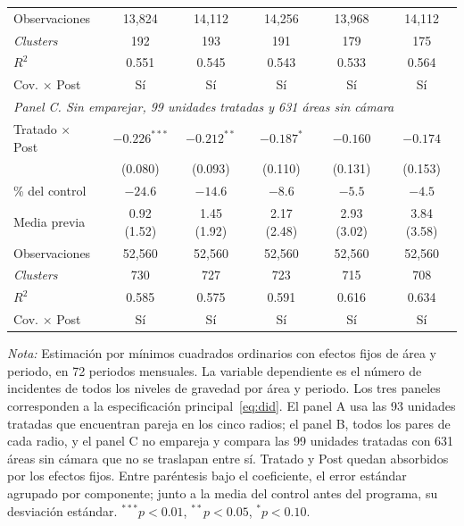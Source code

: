 \begin{table}[htbp]
\begin{tabular}{l c c c c c}
        Observaciones & 13,824 & 14,112 & 14,256 & 13,968 & 14,112 \\
        \emph{Clusters} & 192 & 193 & 191 & 179 & 175 \\
        $R^2$ & 0.551 & 0.545 & 0.543 & 0.533 & 0.564 \\
        Cov. $\times$ Post & Sí & Sí & Sí & Sí & Sí \\
        \midrule
        \multicolumn{6}{l}{\textit{Panel C. Sin emparejar, 99 unidades tratadas y 631 áreas sin cámara}} \\
        Tratado $\times$ Post & $-0.226^{***}$ & $-0.212^{**}$ & $-0.187^{*}$ & $-0.160$ & $-0.174$ \\
         & (0.080) & (0.093) & (0.110) & (0.131) & (0.153) \\
        \% del control & $-24.6$ & $-14.6$ & $-8.6$ & $-5.5$ & $-4.5$ \\
        Media previa & 0.92 (1.52) & 1.45 (1.92) & 2.17 (2.48) & 2.93 (3.02) & 3.84 (3.58) \\
        Observaciones & 52,560 & 52,560 & 52,560 & 52,560 & 52,560 \\
        \emph{Clusters} & 730 & 727 & 723 & 715 & 708 \\
        $R^2$ & 0.585 & 0.575 & 0.591 & 0.616 & 0.634 \\
        Cov. $\times$ Post & Sí & Sí & Sí & Sí & Sí \\
        \bottomrule
    \end{tabular}
    \begin{minipage}{0.95\linewidth}\linespread{1}\selectfont
        \vspace{0.4em}
        \scriptsize \textit{Nota:} Estimación por mínimos cuadrados ordinarios con efectos fijos de área y periodo, en 72 periodos mensuales. La variable dependiente es el número de incidentes de todos los niveles de gravedad por área y periodo. Los tres paneles corresponden a la especificación principal~\eqref{eq:did}. El panel A usa las 93 unidades tratadas que encuentran pareja en los cinco radios; el panel B, todos los pares de cada radio, y el panel C no empareja y compara las 99 unidades tratadas con 631 áreas sin cámara que no se traslapan entre sí. Tratado y Post quedan absorbidos por los efectos fijos. Entre paréntesis bajo el coeficiente, el error estándar agrupado por componente; junto a la media del control antes del programa, su desviación estándar. ${}^{***} p<0.01$, ${}^{**} p<0.05$, ${}^{*} p<0.10$.
    \end{minipage}
\end{table}
